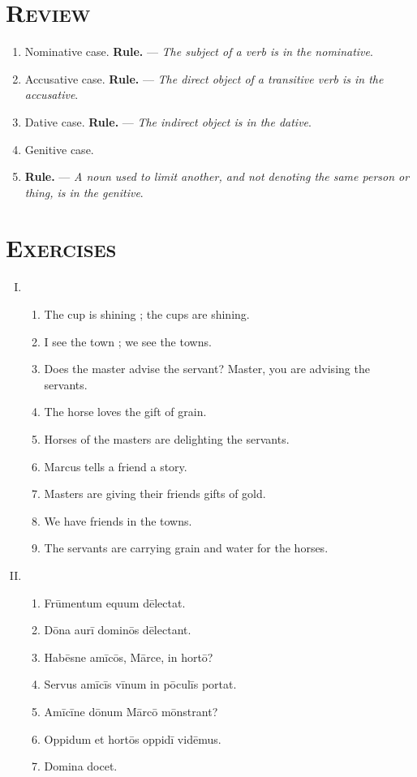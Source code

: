 \documentclass[12pt]{article}
\begin{document}
\section{\textsc{Review}}
\begin{enumerate}[1.]
	\item Nominative case. \textbf{Rule.} --- \textit{The subject of a verb is in the nominative}.
	\item Accusative case. \textbf{Rule.} --- \textit{The direct object of a transitive verb is in the accusative}.
	\item Dative case. \textbf{Rule.} --- \textit{The indirect object is in the dative}.
	\item Genitive case.
	\item \textbf{Rule.} --- \textit{A noun used to limit another, and not denoting the same person or thing, is in the genitive}.
\end{enumerate}

\section{\textsc{Exercises}}
\begin{enumerate}[I.]
	\setlength{\itemsep}{1em}
	\item \begin{enumerate}[1)]
		\item The cup is shining ; the cups are shining.
		\item I see the town ; we see the towns.
		\item Does the master advise the servant? Master, you are advising the servants.
		\item The horse loves the gift of grain.
		\item Horses of the masters are delighting the servants.
		\item Marcus tells a friend a story.
		\item Masters are giving their friends gifts of gold.
		\item We have friends in the towns.
		\item The servants are carrying grain and water for the horses.
	\end{enumerate}
	\item \begin{enumerate}[1)]
		\item Frūmentum equum dēlectat.
		\item Dōna aurī dominōs dēlectant.
		\item Habēsne amīcōs, Mārce, in hortō?
		\item Servus amīcīs vīnum in pōculīs portat.
		\item Amīcīne dōnum Mārcō mōnstrant?
		\item Oppidum et hortōs oppidī vidēmus.
		\item Domina docet.
	\end{enumerate}
\end{enumerate}
\end{document}
